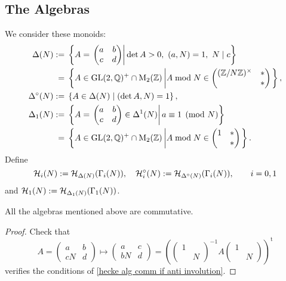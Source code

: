 \subsection{The Algebras}
We consider these monoids:
\begin{align*}
    \Delta(N) := {}& \left\{ A = \left.\begin{pmatrix}
        a&b\\c&d
    \end{pmatrix}\right|\det A > 0,\ (a, N) = 1,\ N\mid c \right\}\\
        ={} & \left\{ A\in\operatorname{GL}(2, \mathbb{Q})^+\cap \mathrm{M}_2(\mathbb{Z})\left| A\bmod N\in \begin{pmatrix}
            (\mathbb{Z}/N\mathbb{Z})^\times & * \\ & *
        \end{pmatrix}\right. \right\},
        \\
    \Delta^\circ(N) :={}& \left\{ A\in\Delta(N) \mid (\det A, N) = 1 \right\},\\
    \Delta_1(N) :={} &\left\{ A = \left.\begin{pmatrix}
        a&b\\c&d
    \end{pmatrix}\in\Delta^1(N)\right|a\equiv 1\pmod N \right\}\\
    ={}& \left\{ A\in\operatorname{GL}(2, \mathbb{Q})^+\cap \mathrm{M}_2(\mathbb{Z})\left| A\bmod N\in \begin{pmatrix}
        1 & * \\ & *
    \end{pmatrix}\right. \right\}.
\end{align*}
Define \[\mathcal{H}_i(N) := \mathcal{H}_{\Delta(N)}(\Gamma_i(N)),\quad \mathcal{H}_i^\circ(N) := \mathcal{H}_{\Delta^\circ(N)}(\Gamma_i(N)),\qquad i=0, 1\]
and $\mathcal{H}_1(N) := \mathcal{H}_{\Delta_1(N)}(\Gamma_1(N))$.

\begin{proposition}
    All the algebras mentioned above are commutative.
\end{proposition}
\begin{proof}
    Check that \[A = \begin{pmatrix}
        a & b \\ cN & d
    \end{pmatrix}\mapsto
    \begin{pmatrix}
        a & c \\ bN & d
    \end{pmatrix} = \left( \begin{pmatrix}
        1 & \\ & N
    \end{pmatrix}^{-1} A \begin{pmatrix}
        1 & \\ & N
    \end{pmatrix} \right)^{\mathrm{t}} \]
    verifies the conditions of \cref{hecke alg comm if anti involution}.
\end{proof}

